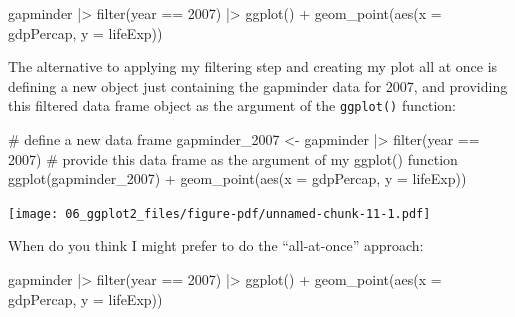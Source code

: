 \documentclass[
  letterpaper,
  DIV=11,
  numbers=noendperiod]{scrreprt}
\newenvironment{Shaded}{\begin{snugshade}}{\end{snugshade}}
\newcommand{\AttributeTok}[1]{\textcolor[rgb]{0.40,0.45,0.13}{#1}}
\newcommand{\CommentTok}[1]{\textcolor[rgb]{0.37,0.37,0.37}{#1}}
\newcommand{\DecValTok}[1]{\textcolor[rgb]{0.68,0.00,0.00}{#1}}
\newcommand{\FunctionTok}[1]{\textcolor[rgb]{0.28,0.35,0.67}{#1}}
\newcommand{\NormalTok}[1]{\textcolor[rgb]{0.00,0.23,0.31}{#1}}
\newcommand{\OtherTok}[1]{\textcolor[rgb]{0.00,0.23,0.31}{#1}}
\newcommand{\SpecialCharTok}[1]{\textcolor[rgb]{0.37,0.37,0.37}{#1}}
\begin{document}
\begin{Shaded}
\begin{Highlighting}[]
\NormalTok{gapminder }\SpecialCharTok{|\textgreater{}}
  \FunctionTok{filter}\NormalTok{(year }\SpecialCharTok{==} \DecValTok{2007}\NormalTok{) }\SpecialCharTok{|\textgreater{}}
  \FunctionTok{ggplot}\NormalTok{() }\SpecialCharTok{+}
  \FunctionTok{geom\_point}\NormalTok{(}\FunctionTok{aes}\NormalTok{(}\AttributeTok{x =}\NormalTok{ gdpPercap, }\AttributeTok{y =}\NormalTok{ lifeExp))}
\end{Highlighting}
\end{Shaded}

The alternative to applying my filtering step and creating my plot all
at once is defining a new object just containing the gapminder data for
2007, and providing this filtered data frame object as the argument of
the \texttt{ggplot()} function:

\begin{Shaded}
\begin{Highlighting}[]
\CommentTok{\# define a new data frame}
\NormalTok{gapminder\_2007 }\OtherTok{\textless{}{-}}\NormalTok{ gapminder }\SpecialCharTok{|\textgreater{}} \FunctionTok{filter}\NormalTok{(year }\SpecialCharTok{==} \DecValTok{2007}\NormalTok{)}
\CommentTok{\# provide this data frame as the argument of my ggplot() function}
\FunctionTok{ggplot}\NormalTok{(gapminder\_2007) }\SpecialCharTok{+}
  \FunctionTok{geom\_point}\NormalTok{(}\FunctionTok{aes}\NormalTok{(}\AttributeTok{x =}\NormalTok{ gdpPercap, }\AttributeTok{y =}\NormalTok{ lifeExp))}
\end{Highlighting}
\end{Shaded}

\texttt{[image: 06\_ggplot2\_files/figure-pdf/unnamed-chunk-11-1.pdf]}

When do you think I might prefer to do the ``all-at-once'' approach:

\begin{Shaded}
\begin{Highlighting}[]
\NormalTok{gapminder }\SpecialCharTok{|\textgreater{}} 
  \FunctionTok{filter}\NormalTok{(year }\SpecialCharTok{==} \DecValTok{2007}\NormalTok{) }\SpecialCharTok{|\textgreater{}} 
  \FunctionTok{ggplot}\NormalTok{() }\SpecialCharTok{+}
  \FunctionTok{geom\_point}\NormalTok{(}\FunctionTok{aes}\NormalTok{(}\AttributeTok{x =}\NormalTok{ gdpPercap, }\AttributeTok{y =}\NormalTok{ lifeExp))}
\end{Highlighting}
\end{Shaded}
\end{document}
